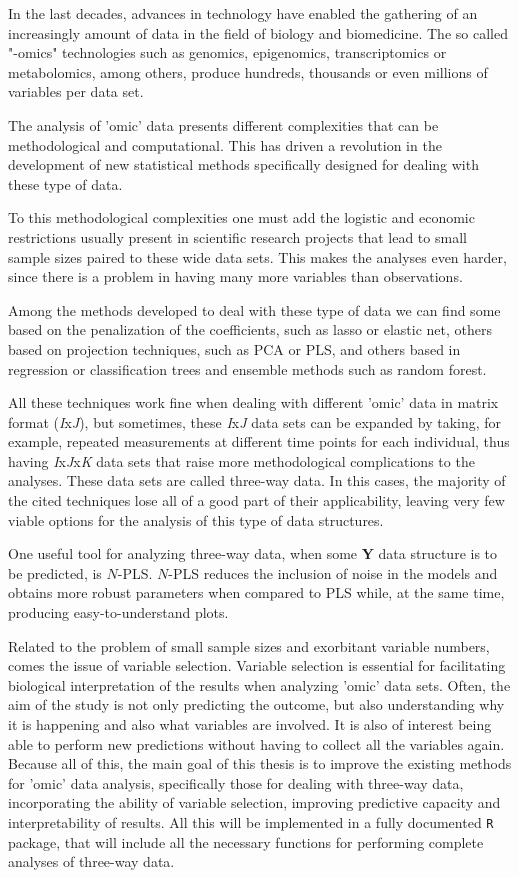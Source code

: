 In the last decades, advances in technology have enabled the gathering of an increasingly amount of data in the field of biology and biomedicine. The so called "-omics" technologies such as genomics, epigenomics, transcriptomics or metabolomics, among others, produce hundreds, thousands or even millions of variables per data set.

The analysis of 'omic' data presents different complexities that can be methodological and computational. This has driven a revolution in the development of new statistical methods specifically designed for dealing with these type of data. 

To this methodological complexities one must add the logistic and economic restrictions usually present in scientific research projects that lead to small sample sizes paired to these wide data sets. This makes the analyses even harder, since there is a problem in having many more variables than observations.

Among the methods developed to deal with these type of data we can find some based on the penalization of the coefficients, such as lasso or elastic net, others based on projection techniques, such as PCA or PLS, and others based in regression or classification trees and ensemble methods such as random forest.

All these techniques work fine when dealing with different 'omic' data in matrix format (\textit{I}x\textit{J}), but sometimes, these \textit{I}x\textit{J} data sets can be expanded by taking, for example, repeated measurements at different time points for each individual, thus having \textit{I}x\textit{J}x\textit{K} data sets that raise more methodological complications to the analyses. These data sets are called three-way data. In this cases, the majority of the cited techniques lose all of a good part of their applicability, leaving very few viable options for the analysis of this type of data structures.

One useful tool for analyzing three-way data, when some \textbf{Y} data structure is to be predicted, is $N$-PLS. $N$-PLS reduces the inclusion of noise in the models and obtains more robust parameters when compared to PLS while, at the same time, producing easy-to-understand plots.

Related to the problem of small sample sizes and exorbitant variable numbers, comes the issue of variable selection. Variable selection is essential for facilitating biological interpretation of the results when analyzing 'omic' data sets. Often, the aim of the study is not only predicting the outcome, but also understanding why it is happening and also what variables are involved. It is also of interest being able to perform new predictions without having to collect all the variables again. Because all of this, the main goal of this thesis is to improve the existing methods for 'omic' data analysis, specifically those for dealing with three-way data, incorporating the ability of variable selection, improving predictive capacity and interpretability of results. All this will be implemented in a fully documented \texttt{R} package, that will include all the necessary functions for performing complete analyses of three-way data.

